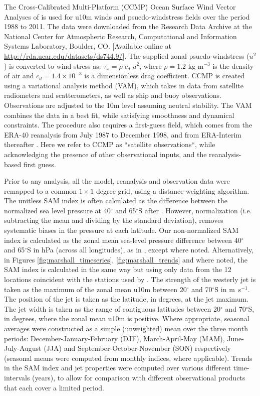 \documentclass{ametsoc}
\begin{document}
The Cross-Calibrated Multi-Platform (CCMP) Ocean Surface Wind Vector Analyses of 
\cite{Atlas_et_al_2011} is used for u10m winds and psuedo-windstress fields over the period
1988 to 2011. The data were downloaded from the Research Data Archive at the National 
Center for Atmospheric Research, Computational and Information Systems Laboratory, Boulder, CO. 
[Available online at \url{http://rda.ucar.edu/datasets/ds744.9/}]. 
The supplied zonal psuedo-windstress ($u^2$) is converted to wind-stress 
as: $\tau_x = \rho\; c_d\; u^2$,
where $\rho=1.2$ kg m$^{-3}$ is the density of air and $c_d=1.4\times10^{-3}$ is a dimensionless
drag coefficient. CCMP is created using a variational analysis method (VAM), which takes in data
from satellite radiometers and scatterometers, as well as ship and buoy observations. Observations
are adjusted to the 10m level assuming neutral stability. The VAM combines the data in a best fit, 
while satisfying smoothness and dynamical constraints. The procedure also requires a first-guess 
field, which comes from the ERA-40 reanalysis from July 1987 to December 1998, and from ERA-Interim 
thereafter \citep{Atlas_et_al_2011}. Here we refer to CCMP as ``satellite observations``, while
acknowledging the presence of other observational inputs, and the reanalysis-based first guess.

Prior to any analysis, all the model, reanalysis and observation data were remapped 
to a common $1\times1$ degree grid, using a distance weighting algorithm. The unitless SAM index is often 
calculated as the difference between the normalized sea level pressure at 
40$^{\circ}$ and 65$^{\circ}$S after \cite{Gong_and_Wang_1999}. However, normalization (i.e. subtracting the
mean and dividing by the standard deviation), removes systematic biases in the pressure at each latitude.
Our non-normalized SAM index is calculated as the zonal mean sea-level pressure difference between
40$^{\circ}$ and 65$^{\circ}$S in hPa (across all longitudes), 
as in \cite{Gillett_and_Fyfe_2013}, except where noted. Alternatively, in Figures 
\ref{fig:marshall_timeseries}, \ref{fig:marshall_trends} and where noted, the 
SAM index is calculated in the same way but using only data from the 12 locations coincident with the 
stations used by \cite{Marshall_2003}. The strength of the westerly jet is taken as the maximum of 
the zonal mean u10m between 20$^{\circ}$ and 70$^{\circ}$S in m~s$^{-1}$. The position of
the jet is taken as the latitude, in degrees, at the jet maximum. The jet width is taken as the range
of contiguous latitudes between 20$^{\circ}$ and 70$^{\circ}$S, in degrees, where the zonal mean u10m 
is positive. Where appropriate, seasonal averages were constructed
as a simple (unweighted) mean over the three month periods: December-January-February (DJF), 
March-April-May (MAM), June-July-August (JJA) and September-October-November (SON) respectively (seasonal
means were computed from monthly indices, where applicable). Trends in the SAM index and jet properties 
were computed over various different time-intervals (years), to allow for comparison with different observational
products that each cover a limited period. 
\end{document}
